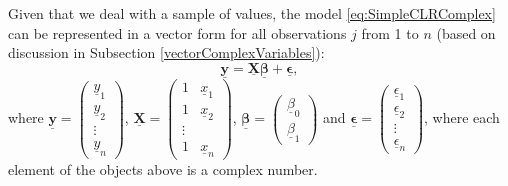 \documentclass[
]{book}
\begin{document}
Given that we deal with a sample of values, the model \eqref{eq:SimpleCLRComplex} can be represented in a vector form for all observations \(j\) from 1 to \(n\) (based on discussion in Subsection \ref{vectorComplexVariables}):
\begin{equation}
    \underline{\mathbf{y}} = \underline{\mathbf{X}} \underline{\boldsymbol{\beta}} + \underline{\boldsymbol{\epsilon}} ,
    \label{eq:SimpleCLRVector}
\end{equation}
where \(\underline{\mathbf{y}}=\begin{pmatrix} \underline{y}_1 \\ \underline{y}_2 \\ \vdots \\ \underline{y}_n \end{pmatrix}\), \(\underline{\mathbf{X}} = \begin{pmatrix} 1 & \underline{x}_1 \\ 1 & \underline{x}_2 \\ \vdots \\ 1 & \underline{x}_n \end{pmatrix}\), \(\underline{\boldsymbol{\beta}} = \begin{pmatrix} \underline{\beta}_0 \\ \underline{\beta}_1 \end{pmatrix}\) and \(\underline{\boldsymbol{\epsilon}} = \begin{pmatrix} \underline{\epsilon}_1 \\ \underline{\epsilon}_2 \\ \vdots \\ \underline{\epsilon}_n \end{pmatrix}\), where each element of the objects above is a complex number.
\end{document}
